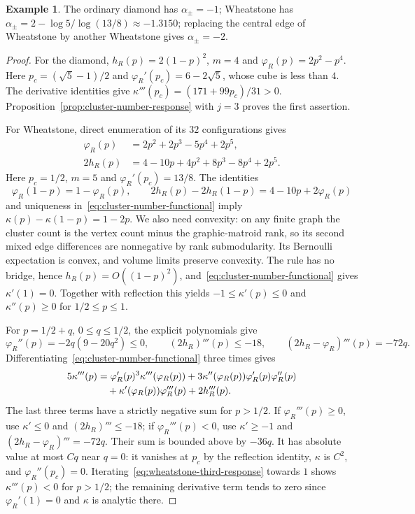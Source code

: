 \documentclass[scheme=plain,11pt]{ctexart}
\theoremstyle{definition}
\newtheorem{example}[theorem]{Example}
\theoremstyle{remark}
\begin{document}
\begin{example}\label{ex:cluster-number-responses}
The ordinary diamond has $\alpha_\pm=-1$; Wheatstone has
$\alpha_\pm=2-\log5/\log(13/8)\approx-1.3150$; replacing the central edge of Wheatstone by another Wheatstone gives $\alpha_\pm=-2$.
\end{example}
\begin{proof}
For the diamond, $h_R(p)=2(1-p)^2$, $m=4$ and $\varphi_R(p)=2p^2-p^4$.
Here $p_c=(\sqrt5-1)/2$ and $\varphi_R'(p_c)=6-2\sqrt5$, whose cube is less than $4$.
The derivative identities give $\kappa'''(p_c)=(171+99p_c)/31>0$.
Proposition~\ref{prop:cluster-number-response} with $j=3$ proves the first assertion.

For Wheatstone, direct enumeration of its $32$ configurations gives
\begin{align*}
 \varphi_R(p)&=2p^2+2p^3-5p^4+2p^5,\\
 2h_R(p)&=4-10p+4p^2+8p^3-8p^4+2p^5.
\end{align*}
Here $p_c=1/2$, $m=5$ and $\varphi_R'(p_c)=13/8$.
The identities
\[
 \varphi_R(1-p)=1-\varphi_R(p),\qquad
 2h_R(p)-2h_R(1-p)=4-10p+2\varphi_R(p)
\]
and uniqueness in~\eqref{eq:cluster-number-functional} imply
$\kappa(p)-\kappa(1-p)=1-2p$.
We also need convexity: on any finite graph the cluster count is the vertex count minus the graphic-matroid rank, so its second mixed edge differences are nonnegative by rank submodularity.
Its Bernoulli expectation is convex, and volume limits preserve convexity.
The rule has no bridge, hence $h_R(p)=O((1-p)^2)$, and~\eqref{eq:cluster-number-functional} gives $\kappa'(1)=0$.
Together with reflection this yields
$-1\le\kappa'(p)\le0$ and $\kappa''(p)\ge0$ for $1/2\le p\le1$.

For $p=1/2+q$, $0\le q\le1/2$, the explicit polynomials give
\[
 \varphi_R''(p)=-2q(9-20q^2)\le0,\qquad
 (2h_R)'''(p)\le-18,\qquad
 (2h_R-\varphi_R)'''(p)=-72q.
\]
Differentiating~\eqref{eq:cluster-number-functional} three times gives
\begin{align}\label{eq:wheatstone-third-response}
 5\kappa'''(p)
 &=\varphi_R'(p)^3\kappa'''(\varphi_R(p))
   +3\kappa''(\varphi_R(p))\varphi_R'(p)\varphi_R''(p)\notag\\
 &\quad+\kappa'(\varphi_R(p))\varphi_R'''(p)+2h_R'''(p).
\end{align}
The last three terms have a strictly negative sum for $p>1/2$.
If $\varphi_R'''(p)\ge0$, use $\kappa'\le0$ and $(2h_R)'''\le-18$; if $\varphi_R'''(p)<0$, use $\kappa'\ge-1$ and $(2h_R-\varphi_R)'''=-72q$.
Their sum is bounded above by $-36q$.
It has absolute value at most $Cq$ near $q=0$: it vanishes at $p_c$ by the reflection identity, $\kappa$ is $C^2$, and $\varphi_R''(p_c)=0$.
Iterating~\eqref{eq:wheatstone-third-response} towards $1$ shows $\kappa'''(p)<0$ for $p>1/2$; the remaining derivative term tends to zero since $\varphi_R'(1)=0$ and $\kappa$ is analytic there.


\end{proof}
\end{document}
